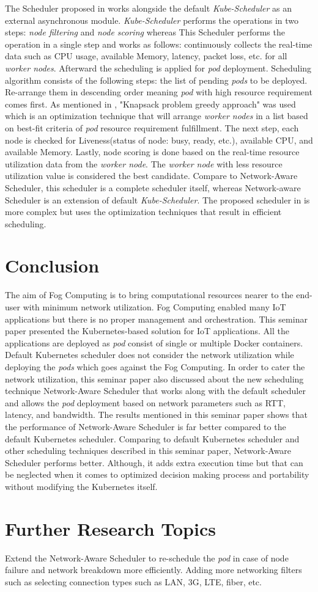 The Scheduler proposed in \cite{8903766} works alongside the default \emph{Kube-Scheduler} as an external asynchronous module. \emph{Kube-Scheduler} performs the operations in two steps: \emph{node filtering} and \emph{node scoring} whereas This Scheduler\cite{8903766} performs the operation in a single step and works as follows: continuously collects the real-time data such as CPU usage, available Memory, latency, packet loss, etc.  for all \emph{worker nodes}. Afterward the scheduling is applied for \emph{pod} deployment. Scheduling algorithm consists of the following steps\cite{8903766}: the list of pending \emph{pods} to be deployed. Re-arrange them in descending order meaning \emph{pod} with high resource requirement comes first. As mentioned in \cite{8903766}, "Knapsack problem greedy approach" was used which is an optimization technique that will arrange \emph{worker nodes} in a list based on best-fit criteria of \emph{pod} resource requirement fulfillment. The next step, each node is checked for Liveness(status of node: busy, ready, etc.), available CPU, and available Memory\cite{8903766}. Lastly, node scoring is done based on the real-time resource utilization data from the \emph{worker node}\cite{8903766}. The \emph{worker node} with less resource utilization value is considered the best candidate\cite{8903766}. Compare to Network-Aware Scheduler\cite{Santos2019}, this scheduler\cite{8903766} is a complete scheduler itself, whereas Network-aware Scheduler\cite{Santos2019} is an extension of default \emph{Kube-Scheduler}. The proposed scheduler in \cite{8903766} is more complex but uses the optimization techniques that result in efficient scheduling.

\section{Conclusion}
\label{sec:concl}
The aim of Fog Computing is to bring computational resources nearer to the end-user with minimum network utilization. Fog Computing enabled many IoT applications but there is no proper management and orchestration. This seminar paper presented the Kubernetes-based solution for IoT applications. All the applications are deployed as \emph{pod} consist of single or multiple Docker containers. Default Kubernetes scheduler does not consider the network utilization while deploying the \emph{pods} which goes against the Fog Computing. In order to cater the network utilization, this seminar paper also discussed about the new scheduling technique Network-Aware Scheduler that works along with the default scheduler and allows the \emph{pod} deployment based on network parameters such as RTT, latency, and bandwidth. The results mentioned in this seminar paper shows that the performance of Network-Aware Scheduler is far better compared to the default Kubernetes scheduler. Comparing to default Kubernetes scheduler and other scheduling techniques described in this seminar paper, Network-Aware Scheduler performs better. Although, it adds extra execution time but that can be neglected when it comes to optimized decision making process and portability without modifying the Kubernetes itself.  
\section{Further Research Topics}
\label{sec:research}
Extend the Network-Aware Scheduler to re-schedule the \emph{pod} in case of node failure and network breakdown more efficiently. Adding more networking filters such as selecting connection types such as LAN, 3G, LTE, fiber, etc.